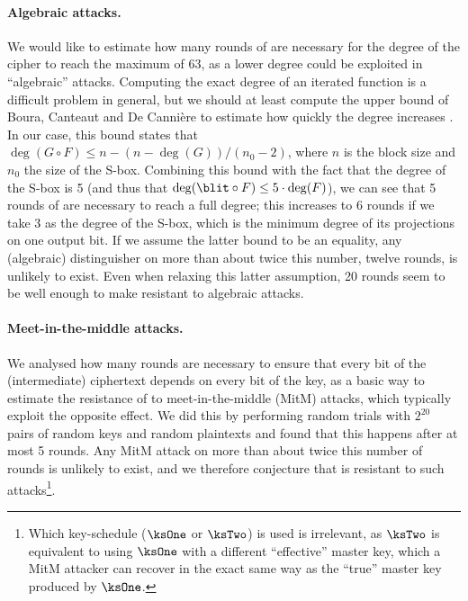\paragraph{Algebraic attacks.}
We would like to estimate how many rounds of \fly are necessary for the degree of the cipher to reach the maximum of 63, as a lower degree could be exploited in
``algebraic'' attacks. Computing the exact degree of an iterated function is a difficult problem in general, but we should at least compute the upper bound of Boura, Canteaut and De Cannière
to estimate how quickly the degree increases \cite{permdegree}. In our case, this bound states that $\deg(G \circ F) \leq n - (n - \deg(G))/(n_0 - 2)$, where $n$ is the block size and $n_0$ the
size of the S-box. Combining this bound with the fact that the degree of the S-box is 5 (and thus that $\deg(\blit \circ F) \leq 5\cdot\deg(F)$), we can see that 5 rounds of
\fly are necessary to reach a full degree; this increases to 6 rounds if we take 3 as the degree of the S-box, which is the minimum degree of its projections on one
output bit. If we assume the latter bound to be an equality, any (algebraic) distinguisher on more than about twice this number, \ie twelve rounds, is unlikely to exist. 
Even when relaxing this latter assumption, 20 rounds seem to be well enough to make \fly resistant to algebraic attacks.

\paragraph{Meet-in-the-middle attacks.}
We analysed how many rounds are necessary to ensure that every bit of the (intermediate) ciphertext depends on every bit of the key, as a basic way to estimate the resistance
of \fly to meet-in-the-middle (MitM) attacks, which typically exploit the opposite effect. We did this by performing random trials with $2^{20}$ pairs of random
keys and random plaintexts and found that this happens after at most 5 rounds. Any MitM attack on more than about twice this number of rounds is unlikely to exist, and
we therefore conjecture that \fly is resistant to such attacks\footnote{Which key-schedule ($\ksOne$ or $\ksTwo$) is used is irrelevant, as $\ksTwo$ is equivalent to
using $\ksOne$ with a different ``effective'' master key, which a MitM attacker can recover in the exact same way as the ``true'' master key produced by $\ksOne$.}.

